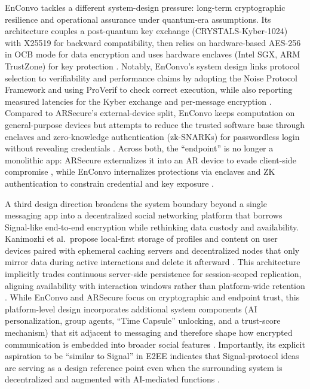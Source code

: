 EnConvo tackles a different system-design pressure: long-term cryptographic resilience and operational assurance under quantum-era assumptions. Its architecture couples a post-quantum key exchange (CRYSTALS-Kyber-1024) with X25519 for backward compatibility, then relies on hardware-based AES-256 in OCB mode for data encryption and uses hardware enclaves (Intel SGX, ARM TrustZone) for key protection \cite{r2025}. Notably, EnConvo’s system design links protocol selection to verifiability and performance claims by adopting the Noise Protocol Framework and using ProVerif to check correct execution, while also reporting measured latencies for the Kyber exchange and per-message encryption \cite{r2025}. Compared to ARSecure’s external-device split, EnConvo keeps computation on general-purpose devices but attempts to reduce the trusted software base through enclaves and zero-knowledge authentication (zk-SNARKs) for passwordless login without revealing credentials \cite{r2025}. Across both, the “endpoint” is no longer a monolithic app: ARSecure externalizes it into an AR device to evade client-side compromise \cite{alsop2025}, while EnConvo internalizes protections via enclaves and ZK authentication to constrain credential and key exposure \cite{r2025}.

A third design direction broadens the system boundary beyond a single messaging app into a decentralized social networking platform that borrows Signal-like end-to-end encryption while rethinking data custody and availability. Kanimozhi et al.\ propose local-first storage of profiles and content on user devices paired with ephemeral caching servers and decentralized nodes that only mirror data during active interactions and delete it afterward \cite{kanimozhi2025}. This architecture implicitly trades continuous server-side persistence for session-scoped replication, aligning availability with interaction windows rather than platform-wide retention \cite{kanimozhi2025}. While EnConvo and ARSecure focus on cryptographic and endpoint trust, this platform-level design incorporates additional system components (AI personalization, group agents, “Time Capsule” unlocking, and a trust-score mechanism) that sit adjacent to messaging and therefore shape how encrypted communication is embedded into broader social features \cite{kanimozhi2025}. Importantly, its explicit aspiration to be “similar to Signal” in E2EE indicates that Signal-protocol ideas are serving as a design reference point even when the surrounding system is decentralized and augmented with AI-mediated functions \cite{kanimozhi2025}.

